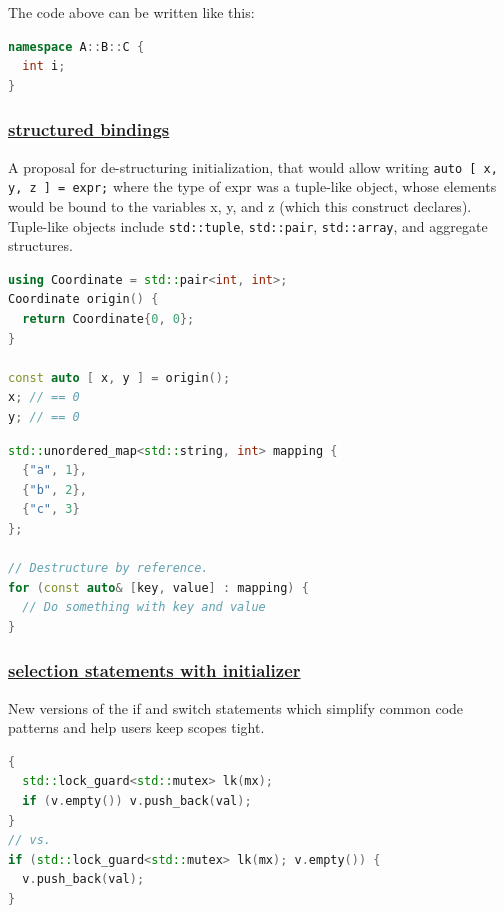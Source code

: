The code above can be written like this:

\begin{lstlisting}[language=C++]
namespace A::B::C {
  int i;
}
\end{lstlisting}

\subsubsection{\href{https://github.com/AnthonyCalandra/modern-cpp-features/tree/master\#structured-bindings}
                    {structured bindings}}
A proposal for de-structuring initialization, that would allow writing 
\texttt{auto [ x, y, z ] = expr;} where the type of expr was a tuple-like 
object, whose elements would be bound to the variables x, y, and z (which 
this construct declares). Tuple-like objects include \texttt{std::tuple}, 
\texttt{std::pair}, \texttt{std::array}, and aggregate structures.

\begin{lstlisting}[language=C++]
using Coordinate = std::pair<int, int>;
Coordinate origin() {
  return Coordinate{0, 0};
}

const auto [ x, y ] = origin();
x; // == 0
y; // == 0
\end{lstlisting}

\begin{lstlisting}[language=C++]
std::unordered_map<std::string, int> mapping {
  {"a", 1},
  {"b", 2},
  {"c", 3}
};

// Destructure by reference.
for (const auto& [key, value] : mapping) {
  // Do something with key and value
}
\end{lstlisting}

\subsubsection{\href{https://github.com/AnthonyCalandra/modern-cpp-features/tree/master\#selection-statements-with-initializer}
                    {selection statements with initializer}}
New versions of the if and switch statements which simplify common code 
patterns and help users keep scopes tight.

\begin{lstlisting}[language=C++]
{
  std::lock_guard<std::mutex> lk(mx);
  if (v.empty()) v.push_back(val);
}
// vs.
if (std::lock_guard<std::mutex> lk(mx); v.empty()) {
  v.push_back(val);
}
\end{lstlisting}

